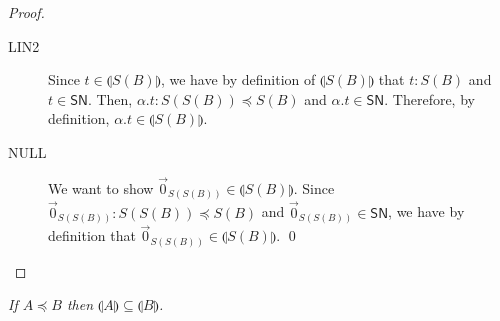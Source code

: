 \documentclass[preprint]{elsarticle}
\newcommand\interp[1]{\llparenthesis #1\rrparenthesis}
\newcommand\SN{\mathsf{SN}}
\newcommand\recap[3]{\noindent {\bf #1 \ref{#2}.} \emph{#3}}
\newcommand\z[1][A]{\vec 0_{S(#1)}}
\newcommand\nullvec[1]{\z[#1]}
\begin{document}
\begin{proof}
\begin{itemize}
\begin{description}
      \item[LIN2]
         Since \( t \in \interp{S(B)} \), we have by definition of \( \interp{S(B)} \) that \( t : S(B) \) and \( t \in \SN \). Then, \( \alpha . t : S(S(B)) \preceq S(B) \) and \( \alpha . t \in \SN \). Therefore, by definition, \( \alpha . t \in \interp{S(B)} \).
      \item[NULL]
         We want to show \( \nullvec{S(B)} \in \interp{S(B)} \). Since \(
         \nullvec{S(B)} : S(S(B)) \preceq S(B) \) and \( \nullvec{S(B)} \in \SN
         \), we have by definition that \( \nullvec{S(B)} \in \interp{S(B)} \).
         \qed
    \end{description}
  \end{itemize}
\end{proof}

\recap{Lemma}{lem:a_subset_b}{
  If \( A \preceq B \) then \( \interp{A} \subseteq \interp{B} \).
}
\end{document}
